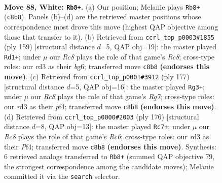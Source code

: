 \documentclass[11pt]{article}
\begin{document}
\clearpage

\begin{figure}[p]\centering
\begin{subfigure}{0.46\textwidth}\centering
\resizebox{\linewidth}{!}{%
\newchessgame
\chessboard[
  setfen={2R5/8/1k6/6K1/r6P/3r4/8/8 w - - 17 88},
  showmover=false,
  pgfstyle=straightmove, color=movearrow, markmove={c8-b8}
]}
\caption{}
\end{subfigure}\hfill
\begin{subfigure}{0.46\textwidth}\centering
\resizebox{\linewidth}{!}{%
\newchessgame
\chessboard[
  setfen={6k1/R5p1/6B1/3K4/8/8/8/2r5 b - - 64 80},
  showmover=false,
  pgfstyle=straightmove, color=movearrow, markmove={c1-d1}
]}
\caption{}
\end{subfigure}
\\[4pt]
\begin{subfigure}{0.46\textwidth}\centering
\resizebox{\linewidth}{!}{%
\newchessgame
\chessboard[
  setfen={8/3k4/4p3/8/5P2/3K4/6r1/4R3 b - - 6 89},
  showmover=false,
  pgfstyle=straightmove, color=movearrow, markmove={g2-g3}
]}
\caption{}
\end{subfigure}\hfill
\begin{subfigure}{0.46\textwidth}\centering
\resizebox{\linewidth}{!}{%
\newchessgame
\chessboard[
  setfen={8/4k3/2R5/5p2/5P2/r3P3/3K4/8 w - - 55 89},
  showmover=false,
  pgfstyle=straightmove, color=movearrow, markmove={c6-c7}
]}
\caption{}
\end{subfigure}
\caption{\textbf{Move 88, White: \texttt{Rb8+}.} (a) Our position; Melanie plays \texttt{Rb8+} (\texttt{c8b8}). Panels (b)--(d) are the retrieved master positions whose correspondence most drove this move (highest QAP objective among those that transfer to it). (b) Retrieved from \texttt{ccrl\_top\_p0003\#1855} (ply 159) [structural distance $d$=5, QAP obj=19]: the master played \texttt{Rd1+}; under $\mu$ our \emph{Rc8} plays the role of that game's \emph{Rc8}; cross-type roles: our \emph{r}d3 as their \emph{b}g6; transferred move \texttt{c8b8} \textbf{(endorses this move)}. (c) Retrieved from \texttt{ccrl\_top\_p0001\#3912} (ply 177) [structural distance $d$=5, QAP obj=16]: the master played \texttt{Rg3+}; under $\mu$ our \emph{Rc8} plays the role of that game's \emph{Rg7}; cross-type roles: our \emph{r}d3 as their \emph{p}f4; transferred move \texttt{c8b8} \textbf{(endorses this move)}. (d) Retrieved from \texttt{ccrl\_top\_p0000\#2003} (ply 176) [structural distance $d$=8, QAP obj=13]: the master played \texttt{Rc7+}; under $\mu$ our \emph{Rc8} plays the role of that game's \emph{Rc6}; cross-type roles: our \emph{r}d3 as their \emph{P}f4; transferred move \texttt{c8b8} \textbf{(endorses this move)}. Synthesis: 6 retrieved analogs transferred to \texttt{Rb8+} (summed QAP objective 79, the strongest correspondence among the candidate moves); Melanie committed it via the \texttt{search} selector.}
\label{fig:thought-m174}
\end{figure}
\end{document}
